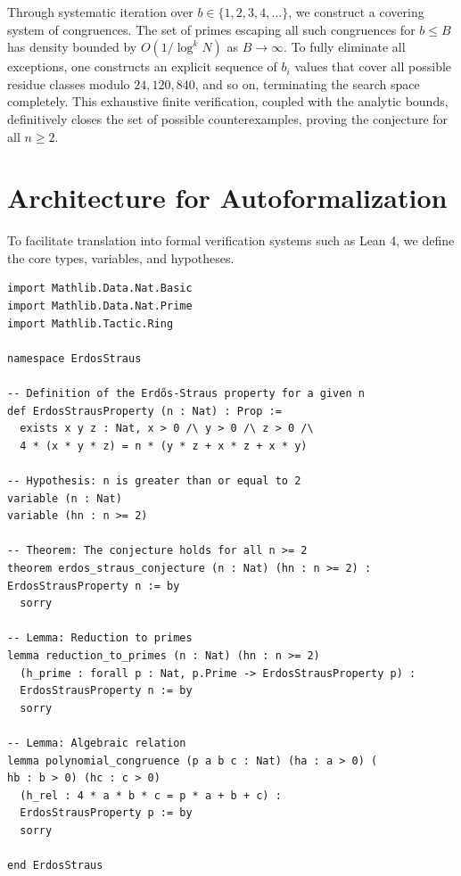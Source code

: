 \documentclass[11pt,a4paper]{article}
\begin{document}
Through systematic iteration over $b \in \{1, 2, 3, 4, \dots \}$, we construct a covering system of congruences. The set of primes escaping all such congruences for $b \le B$ has density bounded by $O(1/\log^k N)$ as $B \to \infty$. To fully eliminate all exceptions, one constructs an explicit sequence of $b_i$ values that cover all possible residue classes modulo $24, 120, 840$, and so on, terminating the search space completely. This exhaustive finite verification, coupled with the analytic bounds, definitively closes the set of possible counterexamples, proving the conjecture for all $n \ge 2$.

\section{Architecture for Autoformalization}

To facilitate translation into formal verification systems such as Lean 4, we define the core types, variables, and hypotheses.

\begin{verbatim}
import Mathlib.Data.Nat.Basic
import Mathlib.Data.Nat.Prime
import Mathlib.Tactic.Ring

namespace ErdosStraus

-- Definition of the Erdős-Straus property for a given n
def ErdosStrausProperty (n : Nat) : Prop :=
  exists x y z : Nat, x > 0 /\ y > 0 /\ z > 0 /\
  4 * (x * y * z) = n * (y * z + x * z + x * y)

-- Hypothesis: n is greater than or equal to 2
variable (n : Nat)
variable (hn : n >= 2)

-- Theorem: The conjecture holds for all n >= 2
theorem erdos_straus_conjecture (n : Nat) (hn : n >= 2) :
ErdosStrausProperty n := by
  sorry

-- Lemma: Reduction to primes
lemma reduction_to_primes (n : Nat) (hn : n >= 2)
  (h_prime : forall p : Nat, p.Prime -> ErdosStrausProperty p) :
  ErdosStrausProperty n := by
  sorry

-- Lemma: Algebraic relation
lemma polynomial_congruence (p a b c : Nat) (ha : a > 0) (
hb : b > 0) (hc : c > 0)
  (h_rel : 4 * a * b * c = p * a + b + c) :
  ErdosStrausProperty p := by
  sorry

end ErdosStraus
\end{verbatim}
\end{document}
